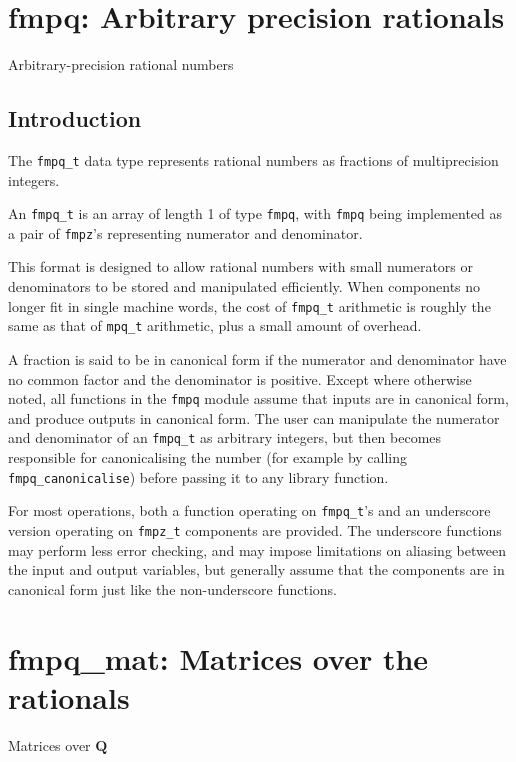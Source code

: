 \documentclass[a4paper,10pt]{book}
\newcommand{\Q}{\mathbf{Q}}%
\newcommand{\code}{\lstinline}
\begin{document}
{{\chapter{fmpq: Arbitrary precision rationals}
\epigraph{Arbitrary-precision rational numbers}{}

\section{Introduction}

The \code{fmpq_t} data type represents rational numbers
as fractions of multiprecision integers.

An \code{fmpq_t} is an array of length 1 of type \code{fmpq},
with \code{fmpq} being implemented as a pair of \code{fmpz}'s
representing numerator and denominator.

This format is designed to allow rational numbers with small
numerators or denominators to be stored and manipulated
efficiently. When components no longer fit in single
machine words, the cost of \code{fmpq_t} arithmetic
is roughly the same as that of \code{mpq_t} arithmetic,
plus a small amount of overhead.

A fraction is said to be in canonical form if the numerator
and denominator have no common factor and the denominator is
positive. Except where otherwise noted, all functions in the
\code{fmpq} module assume that
inputs are in canonical form, and produce outputs in canonical form.
The user can manipulate the numerator and denominator of an
\code{fmpq_t} as arbitrary integers, but then becomes
responsible for canonicalising the number (for example by calling
\code{fmpq_canonicalise}) before passing it to any library function.

For most operations, both a function operating
on \code{fmpq_t}'s and an underscore version operating
on \code{fmpz_t} components are provided. The underscore
functions may perform less error checking,
and may impose limitations on aliasing between the
input and output variables, but
generally assume that the components are in
canonical form just like the non-underscore functions.




\chapter{fmpq\_mat: Matrices over the rationals}
\epigraph{Matrices over $\Q$}{}

}}
\end{document}
